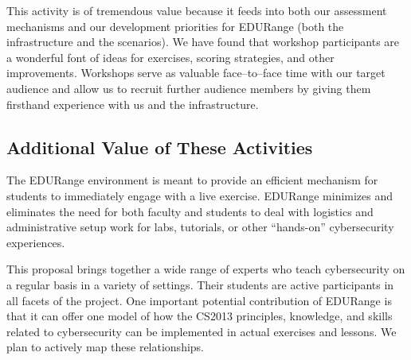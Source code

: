 This activity is of tremendous value because it feeds into both our
assessment mechanisms and our development priorities for EDURange
(both the infrastructure and the scenarios).  We have found that
workshop participants are a wonderful font of ideas for exercises,
scoring strategies, and other improvements.  Workshops serve as
valuable face--to--face time with our target audience and allow us to
recruit further audience members by giving them firsthand experience
with us and the infrastructure.

\subsection{Additional Value of These Activities}

The EDURange environment is meant to provide an efficient mechanism
for students to immediately engage with a live exercise.  EDURange
minimizes and eliminates the need for both faculty and students to
deal with logistics and administrative setup work for labs, tutorials,
or other ``hands-on'' cybersecurity experiences. 

This proposal brings together a wide range of experts who teach
cybersecurity on a regular basis in a variety of settings.  Their
students are active participants in all facets of the project.  One
important potential contribution of EDURange is that it can offer one
model of how the CS2013 principles, knowledge, and skills related to
cybersecurity can be implemented in actual exercises and lessons. We
plan to actively map these relationships.
